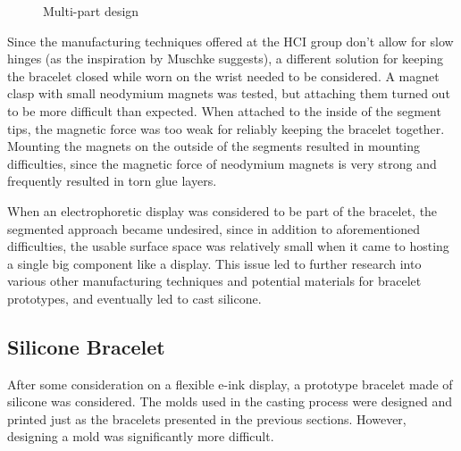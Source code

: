 \begin{figure}[bth]
	\myfloatalign
	 \quad
	\caption{Multi-part design}
\end{figure}

Since the manufacturing techniques offered at the \ac{HCI} group don't allow for slow hinges (as the inspiration by Muschke suggests), a different solution for keeping the bracelet closed while worn on the wrist needed to be considered. A magnet clasp with small neodymium magnets was tested, but attaching them turned out to be more difficult than expected. When attached to the inside of the segment tips, the magnetic force was too weak for reliably keeping the bracelet together. Mounting the magnets on the outside of the segments resulted in mounting difficulties, since the magnetic force of neodymium magnets is very strong and frequently resulted in torn glue layers.

When an electrophoretic display was considered to be part of the bracelet, the segmented approach became undesired, since in addition to aforementioned difficulties, the usable surface space was relatively small when it came to hosting a single big component like a display. This issue led to further research into various other manufacturing techniques and potential materials for bracelet prototypes, and eventually led to cast silicone.

\subsection{Silicone Bracelet}

After some consideration on a flexible e-ink display, a prototype bracelet made of silicone was considered. The molds used in the casting process were designed and printed just as the bracelets presented in the previous sections. However, designing a mold was significantly more difficult.

